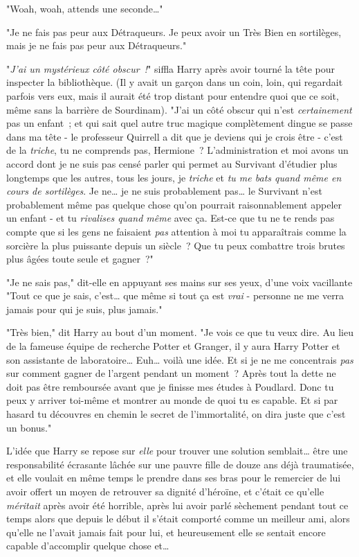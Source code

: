 "Woah, woah, attends une seconde…"

"Je ne fais pas peur aux Détraqueurs. Je peux avoir un Très Bien en sortilèges, mais je ne fais pas peur aux Détraqueurs."

"\emph{J'ai un mystérieux côté obscur~!}" siffla Harry après avoir tourné la tête pour inspecter la bibliothèque. (Il y avait un garçon dans un coin, loin, qui regardait parfois vers eux, mais il aurait été trop distant pour entendre quoi que ce soit, même sans la barrière de Sourdinam). "J'ai un côté obscur qui n'est \emph{certainement} pas un enfant~; et qui sait quel autre truc magique complètement dingue se passe dans ma tête - le professeur Quirrell a dit que je deviens qui je crois être - c'est de la \emph{triche}, tu ne comprends pas, Hermione~? L'administration et moi avons un accord dont je ne suis pas censé parler qui permet au Survivant d'étudier plus longtemps que les autres, tous les jours, je \emph{triche} et \emph{tu me bats quand même en cours de sortilèges}. Je ne… je ne suis probablement pas… le Survivant n'est probablement même pas quelque chose qu'on pourrait raisonnablement appeler un enfant - et tu \emph{rivalises quand même} avec ça. Est-ce que tu ne te rends pas compte que si les gens ne faisaient \emph{pas} attention à moi tu apparaîtrais comme la sorcière la plus puissante depuis un siècle~? Que tu peux combattre trois brutes plus âgées toute seule et gagner~?"

"Je ne sais pas," dit-elle en appuyant ses mains sur ses yeux, d'une voix vacillante "Tout ce que je sais, c'est… que même si tout ça est \emph{vrai} - personne ne me verra jamais pour qui je suis, plus jamais."

"Très bien," dit Harry au bout d'un moment. "Je vois ce que tu veux dire. Au lieu de la fameuse équipe de recherche Potter et Granger, il y aura Harry Potter et son assistante de laboratoire… Euh… voilà une idée. Et si je ne me concentrais \emph{pas} sur comment gagner de l'argent pendant un moment~? Après tout la dette ne doit pas être remboursée avant que je finisse mes études à Poudlard. Donc tu peux y arriver toi-même et montrer au monde de quoi tu es capable. Et si par hasard tu découvres en chemin le secret de l'immortalité, on dira juste que c'est un bonus."

L'idée que Harry se repose sur \emph{elle} pour trouver une solution semblait… être une responsabilité écrasante lâchée sur une pauvre fille de douze ans déjà traumatisée, et elle voulait en même temps le prendre dans ses bras pour le remercier de lui avoir offert un moyen de retrouver sa dignité d'héroïne, et c'était ce qu'elle \emph{méritait} après avoir été horrible, après lui avoir parlé sèchement pendant tout ce temps alors que depuis le début il s'était comporté comme un meilleur ami, alors qu'elle ne l'avait jamais fait pour lui, et heureusement elle se sentait encore capable d'accomplir quelque chose et…

